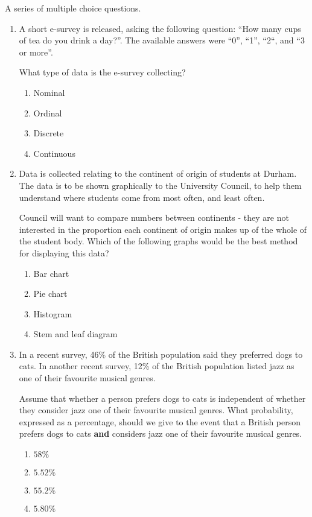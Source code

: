 \documentclass[11pt,a4paper]{article}
\begin{document}
A series of multiple choice questions.
\begin{enumerate}
\item A short e-survey is released, asking the following question: ``How many cups of tea do you drink a day?''. The available answers were ``0'', ``1'', ``2``, and ``3 or more''.

What type of data is the e-survey collecting?

\begin{enumerate}
\item Nominal
\item Ordinal
\item Discrete
\item Continuous
\end{enumerate}




\item Data is collected relating to the continent of origin of students at Durham. The data is to be shown graphically to the University Council, to help them understand where students come from most often, and least often.

Council will want to compare numbers between continents - they are not interested in the proportion each continent of origin makes up of the whole of the student body. Which of the following graphs would be the best method for displaying this data?

\begin{enumerate}
\item Bar chart
\item Pie chart
\item Histogram
\item Stem and leaf diagram
\end{enumerate}



\item In a recent survey, 46\% of the British population said they preferred dogs to cats. In another recent survey, 12\% of the British population listed jazz as one of their favourite musical genres.

Assume that whether a person prefers dogs to cats is independent of whether they consider jazz one of their favourite musical genres. What probability, expressed as a percentage, should we give to the event that a British person prefers dogs to cats \textbf{and} considers jazz one of their favourite musical genres.
\begin{enumerate}
\item $58\%$
\item $5.52\%$
\item $55.2\%$
\item $5.80\%$
\end{enumerate}


\end{enumerate}
\end{document}
